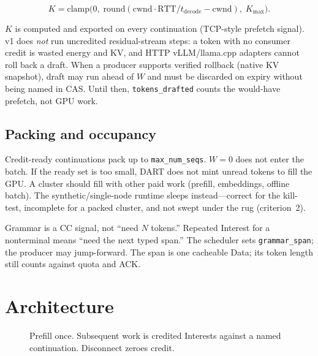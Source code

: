 \documentclass{article}
\theoremstyle{definition}
\newcommand{\cwnd}{\mathrm{cwnd}}
\begin{document}
\begin{equation}
K = \mathrm{clamp}\bigl(0,\; \mathrm{round}(\cwnd \cdot \mathrm{RTT} / t_{\mathrm{decode}} - \cwnd),\; K_{\max}\bigr).
\end{equation}

$K$ is computed and exported on every continuation (TCP-style prefetch signal).
v1 does \emph{not} run uncredited residual-stream steps: a token with no consumer credit is wasted energy and KV, and HTTP vLLM/llama.cpp adapters cannot roll back a draft.
When a producer supports verified rollback (native KV snapshot), draft may run ahead of $W$ and must be discarded on expiry without being named in CAS.
Until then, \texttt{tokens\_drafted} counts the would-have prefetch, not GPU work.

\subsection{Packing and occupancy}

Credit-ready continuations pack up to \texttt{max\_num\_seqs}.
$W{=}0$ does not enter the batch.
If the ready set is too small, DART does not mint unread tokens to fill the GPU.
A cluster should fill with other paid work (prefill, embeddings, offline batch).
The synthetic/single-node runtime sleeps instead---correct for the kill-test, incomplete for a packed cluster, and not swept under the rug (criterion~2).

Grammar is a CC signal, not ``need $N$ tokens.''
Repeated Interest for a nonterminal means ``need the next typed span.''
The scheduler sets \texttt{grammar\_span}; the producer may jump-forward.
The span is one cacheable Data; its token length still counts against quota and ACK.

\section{Architecture}
\label{sec:arch}

\begin{figure}[t]
\centering
{}
\caption{Prefill once. Subsequent work is credited Interests against a named continuation. Disconnect zeroes credit.}
\label{fig:loop}
\end{figure}
\end{document}
